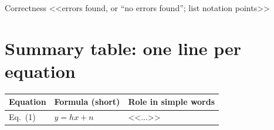 \documentclass[11pt,a4paper]{article}
\begin{document}
\begin{verdict}{Correctness}
<<errors found, or ``no errors found''; list notation points>>
\end{verdict}

\clearpage
{}
\section{Summary table: one line per equation}
{\small
{}
\begin{tabularx}{\textwidth}{P{2.4cm}P{4.6cm}Y}
\toprule
\textbf{Equation} & \textbf{Formula (short)} & \textbf{Role in simple words}\\\midrule
Eq.~(1) & $y=hx+n$ & <<...>>\\
\bottomrule
\end{tabularx}}
\end{document}

